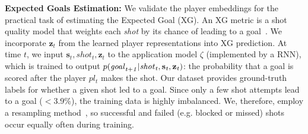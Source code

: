 \documentclass[letterpaper]{article} %
\newcommand{\latentvariables}{\mathbf{z}}
\newcommand{\state}{\mathbf{s}}
\newcommand{\player}{pl}
\begin{document}
{\bf Expected Goals Estimation:} We validate the player embeddings for the practical 
task of estimating the Expected Goal (XG). 
An XG metric is a shot quality model that weights each {\it shot} by its chance of leading to a goal~\cite{Macdonald2012}.
We incorporate $\latentvariables_{t}$ from the learned player representations into XG prediction. 
At time $t$, we input $\state_{t},shot_{t},\latentvariables_{t}$ to the application model $\zeta$ (implemented by a RNN), which is trained to output $p(\it{goal}_{t+1}|\it{shot}_t,\state_{t},\latentvariables_{t})$: the probability that a goal is scored after the player $\player_{t}$ makes the shot.
Our dataset provides ground-truth labels for whether a given shot led to a goal. 
Since only a few shot attempts lead to a goal ($<$3.9\%), the training data is highly imbalanced.
We, therefore, employ a resampling method~\cite{good2006resampling}, so successful and failed (e.g. blocked or missed) shots occur equally often during training.
\end{document}
